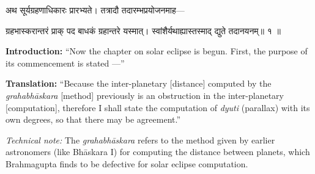 \documentclass[11pt,a4paper]{article}
\newcommand{\dev}[1]{{\devanagarifont #1}}
\newenvironment{sanskritverse}{%
  \begin{center}\begin{minipage}{0.95\textwidth}
  \setlength{\leftskip}{1em}
  \setlength{\rightskip}{1em}
  \dev
}{\end{minipage}\end{center}}
\newenvironment{paracol}[1]{\begingroup}{\endgroup}
\newcommand{\switchcolumn}[1][]{%
  \ifnum#1=0\relax\else\par\nobreak\vspace{0.5em}\par\nobreak\fi%
}
\begin{document}
\begin{paracol}{2}

\begin{sanskritverse}
अथ सूर्यग्रहणाधिकारः प्रारभ्यते। तत्रादौ तदारम्भप्रयोजनमाह—
\end{sanskritverse}

\begin{sanskritverse}
ग्रहभास्करान्तरं प्राक् पद बाधकं ग्रहान्तरे यस्मात्।
स्वांशैर्यथाह्यास्तस्माद् द्युते तदानयनम्॥ १ ॥
\end{sanskritverse}

\switchcolumn

\textbf{Introduction:} ``Now the chapter on solar eclipse is begun. First, the purpose of its commencement is stated ---''

\textbf{Translation:} ``Because the inter-planetary [distance] computed by the \textit{grahabhāskara} [method] previously is an obstruction in the inter-planetary [computation], therefore I shall state the computation of \textit{dyuti} (parallax) with its own degrees, so that there may be agreement.''

\textit{Technical note:} The \textit{grahabhāskara} refers to the method given by earlier astronomers (like Bhāskara I) for computing the distance between planets, which Brahmagupta finds to be defective for solar eclipse computation.

\end{paracol}

\vspace{0.5em}
\end{document}
